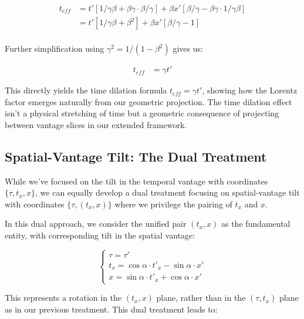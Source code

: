 \documentclass{article}
\begin{document}
\begin{equation}
\begin{aligned}
t_{eff} &= t'[1/\gamma\beta + \beta\gamma \cdot \beta/\gamma] + \beta x'[\beta/\gamma - \beta\gamma \cdot 1/\gamma\beta] \\
&= t'[1/\gamma\beta + \beta^2] + \beta x'[\beta/\gamma - 1] \\
\end{aligned}
\end{equation}

Further simplification using $\gamma^2 = 1/(1-\beta^2)$ gives us:

\begin{equation}
\begin{aligned}
t_{eff} &= \gamma t'
\end{aligned}
\end{equation}

This directly yields the time dilation formula $t_{eff} = \gamma t'$, showing how the Lorentz factor emerges naturally from our geometric projection. The time dilation effect isn't a physical stretching of time but a geometric consequence of projecting between vantage slices in our extended framework.

\subsection{Spatial-Vantage Tilt: The Dual Treatment}

While we've focused on the tilt in the temporal vantage with coordinates $\{\tau, t_x, x\}$, we can equally develop a dual treatment focusing on spatial-vantage tilt with coordinates $\{\tau, (t_x, x)\}$ where we privilege the pairing of $t_x$ and $x$.

In this dual approach, we consider the unified pair $(t_x, x)$ as the fundamental entity, with corresponding tilt in the spatial vantage:

\begin{equation}
\begin{cases}
\tau = \tau' \\
t_x = \cos\alpha \cdot t'_x - \sin\alpha \cdot x' \\
x = \sin\alpha \cdot t'_x + \cos\alpha \cdot x'
\end{cases}
\end{equation}

This represents a rotation in the $(t_x, x)$ plane, rather than in the $(\tau, t_x)$ plane as in our previous treatment. This dual treatment leads to:
\end{document}
